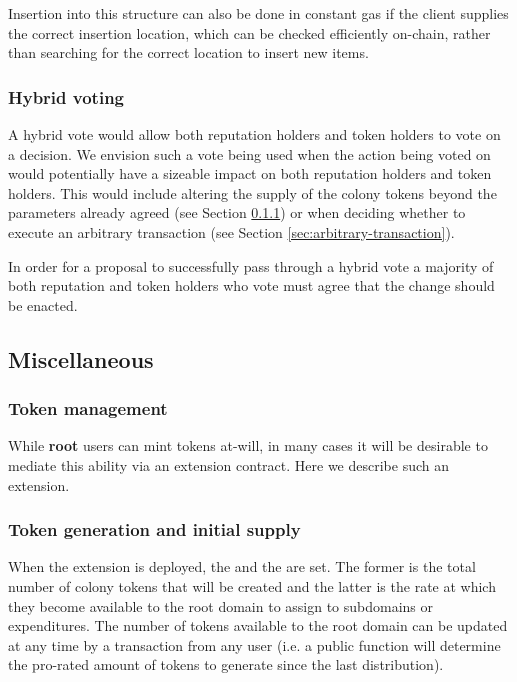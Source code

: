 Insertion into this structure can also be done in constant gas if the client supplies the correct insertion location, which can be checked efficiently on-chain, rather than searching for the correct location to insert new items.

\subsubsection*{Hybrid voting}

A hybrid vote would allow both reputation holders and token holders to vote on a decision. We envision such a vote being used when the action being voted on would potentially have a sizeable impact on both reputation holders and token holders. This would include altering the supply of the colony tokens beyond the parameters already agreed (see Section \ref{sec:colony-token-management}) or when deciding whether to execute an arbitrary transaction (see Section \ref{sec:arbitrary-transaction}).

In order for a proposal to successfully pass through a hybrid vote a majority of both reputation and token holders who vote must agree that the change should be enacted.

\subsection{Miscellaneous}\label{sec:extensions-misc}

\subsubsection{Token management}\label{sec:colony-token-management}

While \textbf{root} users can mint tokens at-will, in many cases it will be desirable to mediate this ability via an extension contract. Here we describe such an extension.

\subsubsection*{Token generation and initial supply}

When the extension is deployed, the  and the  are set. The former is the total number of colony tokens that will be created and the latter is the rate at which they become available to the root domain to assign to subdomains or expenditures. The number of tokens available to the root domain can be updated at any time by a transaction from any user (i.e. a public function will determine the pro-rated amount of tokens to generate since the last distribution).

